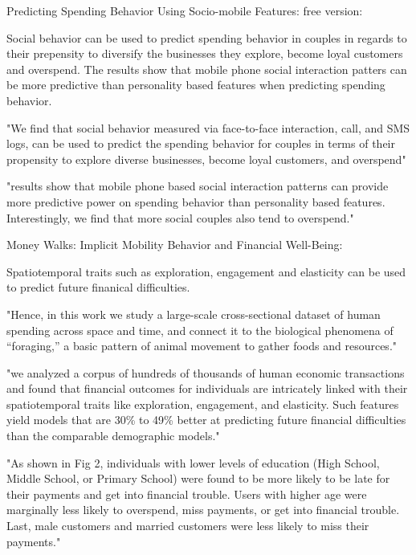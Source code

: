 Predicting Spending Behavior Using Socio-mobile Features:
free version:

Social behavior can be used to predict spending behavior in couples in regards to their prepensity to diversify the businesses they explore, become loyal customers and overspend. The results show that mobile phone social interaction patters can be more predictive than personality based features when predicting spending behavior. 

"We find that social behavior measured via face-to-face interaction, call, and SMS logs, can be used to predict the spending behavior for couples in terms of their propensity to explore diverse businesses, become loyal customers, and overspend"

"results show that mobile phone based social interaction patterns can provide more predictive power on spending behavior than personality based features. Interestingly, we find that more social couples also tend to overspend."




Money Walks: Implicit Mobility Behavior and Financial Well-Being:

Spatiotemporal traits such as exploration, engagement and elasticity can be used to predict future finanical difficulties. 

"Hence, in this work we study a large-scale cross-sectional dataset of human spending across space and time, and connect it to the biological phenomena of “foraging,” a basic pattern of animal movement to gather foods and resources."

"we analyzed a corpus of hundreds of thousands of human economic transactions and found that financial outcomes for individuals are intricately linked with their spatiotemporal traits like exploration, engagement, and elasticity. Such features yield models that are 30\% to 49\% better at predicting future financial difficulties than the comparable demographic models."

"As shown in Fig 2, individuals with lower levels of education (High School, Middle School, or Primary School) were found to be more likely to be late for their payments and get into financial trouble. Users with higher age were marginally less likely to overspend, miss payments, or get into financial trouble. Last, male customers and married customers were less likely to miss their payments."

